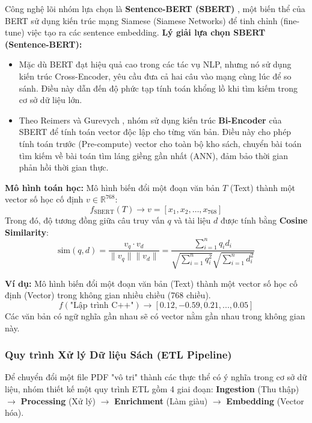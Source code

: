 Công nghệ lõi nhóm lựa chọn là \textbf{Sentence-BERT (SBERT)} \cite{Reimers2019SentenceBERT}, một biến thể của BERT \cite{Devlin2019BERT} sử dụng kiến trúc mạng Siamese (Siamese Networks) để tinh chỉnh (fine-tune) việc tạo ra các sentence embedding.
\textbf{Lý giải lựa chọn SBERT (Sentence-BERT):}  \\
\begin{itemize}
\item Mặc dù BERT \cite{Devlin2019BERT} đạt hiệu quả cao trong các tác vụ NLP, nhưng nó sử dụng kiến trúc Cross-Encoder, yêu cầu đưa cả hai câu vào mạng cùng lúc để so sánh. Điều này dẫn đến độ phức tạp tính toán khổng lồ khi tìm kiếm trong cơ sở dữ liệu lớn.  
\item Theo Reimers và Gurevych \cite{Reimers2019SentenceBERT}, nhóm sử dụng kiến trúc \textbf{Bi-Encoder} của SBERT để tính toán vector độc lập cho từng văn bản. Điều này cho phép tính toán trước (Pre-compute) vector cho toàn bộ kho sách, chuyển bài toán tìm kiếm về bài toán tìm láng giềng gần nhất (ANN), đảm bảo thời gian phản hồi thời gian thực. 

\end{itemize}

\textbf{Mô hình toán học:}
Mô hình biến đổi một đoạn văn bản $T$ (Text) thành một vector số học cố định $v \in \mathbb{R}^{768}$:
\begin{equation}
    f_{\text{SBERT}}(T) \rightarrow v = [x_1, x_2, \dots, x_{768}]
\end{equation}
Trong đó, độ tương đồng giữa câu truy vấn $q$ và tài liệu $d$ được tính bằng \textbf{Cosine Similarity}:
\begin{equation}
    \text{sim}(q, d) = \frac{v_q \cdot v_d}{\|v_q\| \|v_d\|} = \frac{\sum_{i=1}^{n} q_i d_i}{\sqrt{\sum_{i=1}^{n} q_i^2} \sqrt{\sum_{i=1}^{n} d_i^2}}
\end{equation}


\textbf{Ví dụ:} Mô hình biến đổi một đoạn văn bản (Text) thành một vector số học cố định (Vector) trong không gian nhiều chiều (768 chiều).
\begin{equation}
    f(\text{"Lập trình C++"}) \rightarrow [0.12, -0.59, 0.21, ..., 0.05]
\end{equation}
Các văn bản có ngữ nghĩa gần nhau sẽ có vector nằm gần nhau trong không gian này.
\subsubsection{Quy trình Xử lý Dữ liệu Sách (ETL Pipeline)}
Để chuyển đổi một file PDF "vô tri" thành các thực thể có ý nghĩa trong cơ sở dữ liệu, nhóm thiết kế một quy trình ETL gồm 4 giai đoạn: \textbf{Ingestion} (Thu thập) $\rightarrow$ \textbf{Processing} (Xử lý) $\rightarrow$ \textbf{Enrichment} (Làm giàu) $\rightarrow$ \textbf{Embedding} (Vector hóa).

